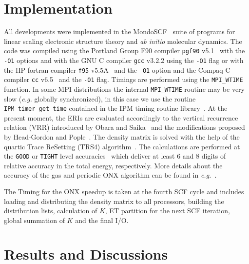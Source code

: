 \documentclass[prl,twocolumn,twocolumngrid,superbib]{revtex4} %
\begin{document}
\section{Implementation}\label{Sec:Impl}
 
 All developments were implemented in the {\sc MondoSCF}~\cite{MondoSCF_1.0-alpha-10} suite of
 programs for linear scaling electronic structure theory and 
 {\it ab initio} molecular dynamics. 
 The code was compiled using the Portland Group F90 
 compiler {\tt pgf90} v5.1~\cite{pgf90-v5.1} with the {\tt -O1} options 
 and with the GNU C compiler {\tt gcc} v3.2.2 using the {\tt -O1} flag
 or with the HP fortran compiler {\tt f95} v5.5A~\cite{f95-v5.5a} 
 and the {\tt -O1} option and the Compaq C compiler {\tt cc} 
 v6.5~\cite{cc-v6.5} and the {\tt -O1} flag.
 Timings are performed using the {\tt MPI\_WTIME} function. 
 In some MPI distributions the internal {\tt MPI\_WTIME} 
 routine may be very slow ({\em e.g.} globally synchronized), 
 in this case we use the routine {\tt IPM\_timer\_get\_time} contained in 
 the IPM timing routine library~\cite{IPM}.
 At the present moment, the ERIs are evaluated accordingly to
 the vertical recurrence relation (VRR) introduced by Obara 
 and Saika~\cite{SObara86} and the modifications proposed by Head-Gordon
 and Pople~\cite{MGordon88}.
 The density matrix is solved with the help of the quartic Trace ReSetting (TRS4) algorithm~\cite{ANiklasson03}.
 The calculations are performed at the {\tt GOOD} or {\tt TIGHT} 
 level accuracies~\cite{CTymczak04b} which deliver at least 6 and 8 digits of
 relative accuracy in the total energy, respectively. 
 More details about the accuracy of the gas and periodic ONX algorithm can be 
 found in {\em e.g.}~\cite{ESchwegler97,CTymczak04b}. 

 The Timing for the ONX speedup is taken at the fourth SCF cycle
 and includes loading and distributing the density matrix to all 
 processors, building the distribution lists, calculation of $K$,
 ET partition for the next SCF iteration, global summation of $K$
 and the final I/O.


\section{Results and Discussions}\label{Sec:Disc}
\end{document}
